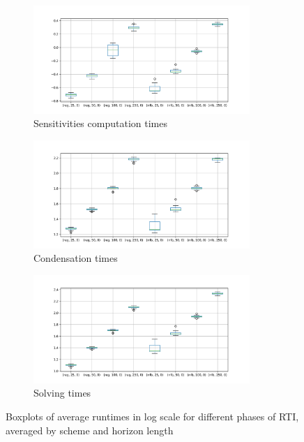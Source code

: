 \documentclass[12pt]{article}
\begin{document}
\begin{itemize}[label=\textbullet]
	\begin{figure}[!hp]
		\centering
		\begin{subfigure}{\textwidth}
			\centering
			\includegraphics[width=0.9\textwidth]{images/exp_all_plot_runtimes_1.png}
			\caption{Sensitivities computation times}
			\label{fig:sensitivity-times}
		\end{subfigure}\newline
		\begin{subfigure}{\textwidth}
			\centering
			\includegraphics[width=0.9\textwidth]{images/exp_all_plot_runtimes_2.png}
			\caption{Condensation times}
			\label{fig:condensation-times}
		\end{subfigure}\newline
		\begin{subfigure}{\textwidth}
			\centering
			\includegraphics[width=0.9\textwidth]{images/exp_all_plot_runtimes_3.png}
			\caption{Solving times}
			\label{fig:solving-times}
		\end{subfigure}

		\caption{Boxplots of average runtimes in log scale for different phases of RTI, \\ averaged by scheme and horizon length}
		\label{fig:runtimes}
	\end{figure}

\end{itemize}
\end{document}
